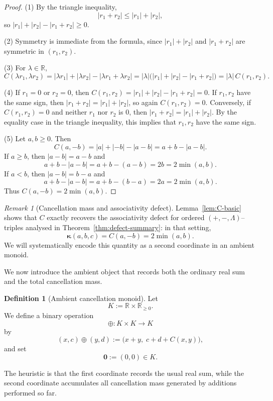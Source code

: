 \documentclass[11pt]{amsart}
\numberwithin{equation}{section}
\theoremstyle{definition}
\newtheorem{definition}[theorem]{Definition}
\theoremstyle{remark}
\newtheorem{remark}[theorem]{Remark}
\newcommand{\R}{\mathbb{R}}
\newcommand{\AssocCurv}{\boldsymbol{\kappa}} %
\newcommand{\Kamb}{K}                      %
\newcommand{\Cfun}{C}                      %
\begin{document}
\begin{proof}
(1) By the triangle inequality,
\[
  |r_1 + r_2|
  \le |r_1| + |r_2|,
\]
so $|r_1|+|r_2|-|r_1+r_2|\ge 0$.

(2) Symmetry is immediate from the formula, since $|r_1|+|r_2|$ and
$|r_1+r_2|$ are symmetric in $(r_1,r_2)$.

(3) For $\lambda\in\R$,
\[
  \Cfun(\lambda r_1,\lambda r_2)
  = |\lambda r_1| + |\lambda r_2| - |\lambda r_1 + \lambda r_2|
  = |\lambda|\bigl(|r_1| + |r_2| - |r_1+r_2|\bigr)
  = |\lambda|\,\Cfun(r_1,r_2).
\]

(4) If $r_1=0$ or $r_2=0$, then
$\Cfun(r_1,r_2)=|r_1|+|r_2|-|r_1+r_2|=0$.  If $r_1,r_2$ have the same
sign, then $|r_1+r_2|=|r_1|+|r_2|$, so again $\Cfun(r_1,r_2)=0$.
Conversely, if $\Cfun(r_1,r_2)=0$ and neither $r_1$ nor $r_2$ is $0$,
then $|r_1+r_2|=|r_1|+|r_2|$.  By the equality case in the triangle
inequality, this implies that $r_1,r_2$ have the same sign.

(5) Let $a,b\ge 0$.  Then
\[
  \Cfun(a,-b)
  = |a|+|-b|-|a-b|
  = a+b-|a-b|.
\]
If $a\ge b$, then $|a-b|=a-b$ and
\[
  a+b-|a-b|
  = a+b-(a-b)
  = 2b
  = 2\min(a,b).
\]
If $a<b$, then $|a-b|=b-a$ and
\[
  a+b-|a-b|
  = a+b-(b-a)
  = 2a
  = 2\min(a,b).
\]
Thus $\Cfun(a,-b)=2\min(a,b)$.
\end{proof}

\begin{remark}[Cancellation mass and associativity defect]
\label{rem:C-defect}
Lemma~\ref{lem:C-basic} shows that $\Cfun$ exactly recovers the
associativity defect for ordered $(+,-,\Lambda)$--triples analysed in
Theorem~\ref{thm:defect-summary}: in that setting,
\[
  \AssocCurv(a,b,c)
  = \Cfun(a,-b)
  = 2\min(a,b).
\]
We will systematically encode this quantity as a second coordinate in
an ambient monoid.
\end{remark}

We now introduce the ambient object that records both the ordinary
real sum and the total cancellation mass.

\begin{definition}[Ambient cancellation monoid]\label{def:ambient-monoid}
Let
\[
  \Kamb := \R\times\R_{\ge 0}.
\]
We define a binary operation
\[
  \oplus : \Kamb\times\Kamb \longrightarrow \Kamb
\]
by
\[
  (x,c)\oplus(y,d)
  := \bigl(x+y,\; c+d+\Cfun(x,y)\bigr),
\]
and set
\[
  \mathbf{0} := (0,0)\in\Kamb.
\]
\end{definition}

The heuristic is that the first coordinate records the usual real sum,
while the second coordinate accumulates all cancellation mass generated
by additions performed so far.
\end{document}
